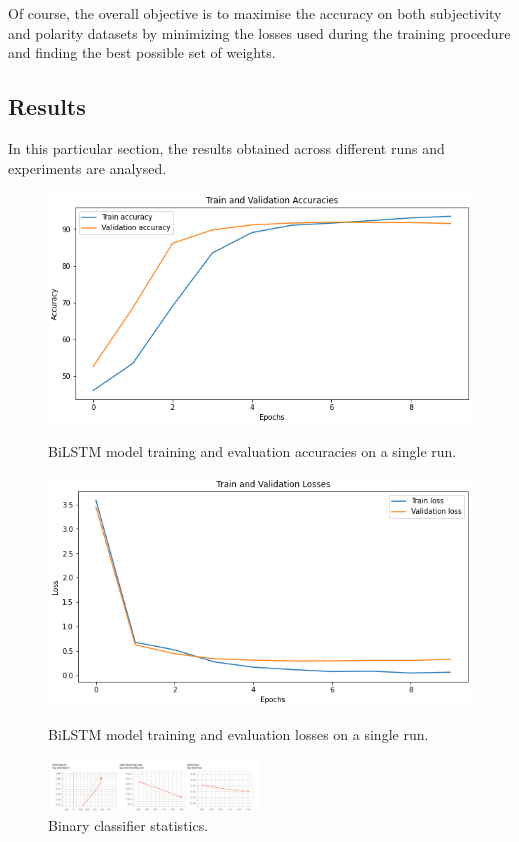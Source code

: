 Of course, the overall objective is to maximise the accuracy on both subjectivity and polarity datasets by minimizing the losses used during the training procedure and 
finding the best possible set of weights. 

\subsection{Results}
\label{subsec:res}
In this particular section, the results obtained across different runs and experiments are analysed. 
\begin{figure}
    \centering
    \includegraphics[scale=0.28]{Images/singlerunacc.png}
    \vspace{-1.0em}
    \caption{BiLSTM model training and evaluation accuracies on a single run.}
    \label{fig:singlerunacc}
    \includegraphics[scale=0.28]{Images/singlerunloss.png}
    \vspace{-1.0em}
    \caption{BiLSTM model training and evaluation losses on a single run.}
    \label{fig:singlerunloss}
    \includegraphics[width=0.5\textwidth]{Images/BinaryCLF.png}
    \vspace{-1.0em}
    \caption{Binary classifier statistics.}
    \vspace{-1.0em}
    \label{fig:singleepoch}
\end{figure}


